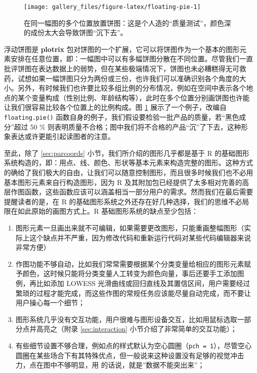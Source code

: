 \documentclass[
  b5paper,
  UTF8,twoside]{book}
\begin{document}
\begin{figure}

{\centering \texttt{[image: gallery\_files/figure-latex/floating-pie-1]} 

}

\caption[在同一幅图的多个位置放置饼图]{在同一幅图的多个位置放置饼图：这是个人造的``质量测试''，颜色深的成份太大会导致饼图``沉下去''。}\label{fig:floating-pie}
\end{figure}

浮动饼图是 \textbf{plotrix} 包对饼图的一个扩展，它可以将饼图作为一个基本的图形元素安排在任意位置，即：一幅图中可以有多幅饼图分散在不同位置。尽管我们一直批评饼图在表达数据上的弱势，但在某些极端情况下，饼图也未必糟糕得无可救药，试想如果一幅饼图只分为两份或三份，也许我们可以准确识别各个角度的大小。另外，有时候我们也许要比较多组比例的分布情况，例如在空间中表示各个地点的某个变量构成（性别比例、年龄结构等），此时在多个位置分别画饼图也许能让我们很容易比较各个位置上的比例构成。图 \ref{fig:floating-pie}
展示了一个例子，改编自 \texttt{floating.pie()} 函数自身的例子，我们假设要检验一批产品的质量，若``黑色成分''超过 50 \% 则表明质量不合格；图中我们将不合格的产品``沉''了下去，这种形象表达或许更能引起读图者的注意。

至此，除了 \ref{sec:parcoords} 小节，我们所介绍的图形几乎都是基于 R 的基础图形系统构造的，即：用点、线、颜色、形状等基本元素来构造完整的图形。这种方式的确给了我们极大的自由，让我们可以随意控制图形，而且很多时候我们也不必用基本图形元素来自行构造图形，因为 R 及其附加包已经提供了太多相对完善的高层作图函数，这些函数应该可以涵盖相当一部分用户的需求。然而我们在最后需要提醒读者的是，在 R 的基础图形系统之外还存在好几种选择，我们的思维不必局限在如此原始的画图方式上。R 基础图形系统的缺点至少包括：

\begin{enumerate}
\def\labelenumi{\arabic{enumi}.}
\item
  图形元素一旦画出来就不可编辑，如果需要更改图形，只能重画整幅图形（实际上这个缺点并不严重，因为修改代码和重新运行代码对某些代码编辑器来说非常方便）
\item
  作图功能不够自动，比如我们常常需要根据某个分类变量给相应的图形元素赋予颜色，这时候只能将分类变量人工转变为颜色向量，事后还要手工添加图例，再比如添加 LOWESS 光滑曲线或回归直线及其置信区间，用户需要经过繁琐的过程才能完成，而这些作图的常规任务应该能尽量自动完成，而不要让用户操心每一个细节；
\item
  图形系统几乎没有交互功能，用户很难与图形设备交互，比如用鼠标选取一部分点并高亮之（附录 \ref{sec:interaction} 小节介绍了非常简单的交互功能）；
\item
  有些细节设置不够合理，例如点的样式默认为空心圆圈（\texttt{pch\ =\ 1}），尽管空心圆圈在某些场合下有其特殊优点，但一般说来这种设置没有足够的视觉冲击力，点在图中不够明显，用 \citet{Cleveland85} 的话说，就是''数据不能突出来''；
\end{enumerate}
\end{document}
